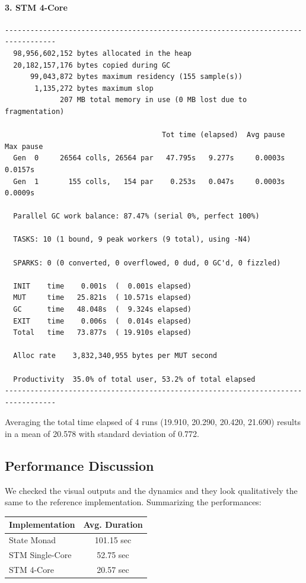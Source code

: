 \paragraph{3. STM 4-Core}
\begin{verbatim}
----------------------------------------------------------------------------------
  98,956,602,152 bytes allocated in the heap
  20,182,157,176 bytes copied during GC
      99,043,872 bytes maximum residency (155 sample(s))
       1,135,272 bytes maximum slop
             207 MB total memory in use (0 MB lost due to fragmentation)

                                     Tot time (elapsed)  Avg pause  Max pause
  Gen  0     26564 colls, 26564 par   47.795s   9.277s     0.0003s    0.0157s
  Gen  1       155 colls,   154 par    0.253s   0.047s     0.0003s    0.0009s

  Parallel GC work balance: 87.47% (serial 0%, perfect 100%)

  TASKS: 10 (1 bound, 9 peak workers (9 total), using -N4)

  SPARKS: 0 (0 converted, 0 overflowed, 0 dud, 0 GC'd, 0 fizzled)

  INIT    time    0.001s  (  0.001s elapsed)
  MUT     time   25.821s  ( 10.571s elapsed)
  GC      time   48.048s  (  9.324s elapsed)
  EXIT    time    0.006s  (  0.014s elapsed)
  Total   time   73.877s  ( 19.910s elapsed)

  Alloc rate    3,832,340,955 bytes per MUT second

  Productivity  35.0% of total user, 53.2% of total elapsed
----------------------------------------------------------------------------------
\end{verbatim}
 
Averaging the total time elapsed of 4 runs (19.910, 20.290, 20.420, 21.690) results in a mean of 20.578 with standard deviation of 0.772.

\subsection{Performance Discussion}
We checked the visual outputs and the dynamics and they look qualitatively the same to the reference implementation. Summarizing the performances:
\begin{center}
  \begin{tabular}{ l || c }
    Implementation & Avg. Duration \\ \hline \hline 
    State Monad & 101.15 sec \\ \hline
   	STM Single-Core & 52.75 sec \\ \hline
   	STM 4-Core & 20.57 sec 
  \end{tabular}
\end{center}

